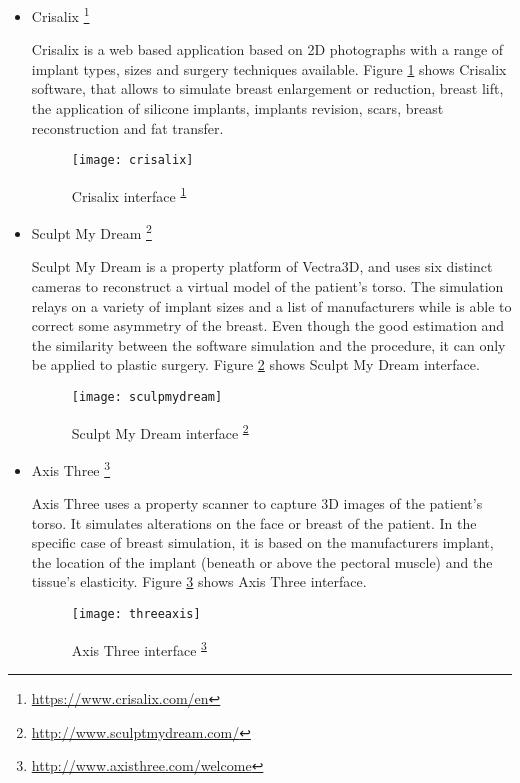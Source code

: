 \begin{itemize}
\item Crisalix \footnote{\label{crisalix} \url{https://www.crisalix.com/en}}

Crisalix is a web based application based on 2D photographs with a range of implant types, sizes and surgery techniques available. Figure \ref{fig:crisalix} shows Crisalix software, that allows to simulate breast enlargement or reduction, breast lift, the application of silicone implants, implants revision, scars, breast reconstruction and fat transfer.

\begin{figure}[H]
\begin{center}
    \leavevmode
    \texttt{[image: crisalix]}
    \caption[Crisalix interface]{Crisalix interface \textsuperscript{\ref{crisalix}}}
    \label{fig:crisalix}
  \end{center}
\end{figure}


\item Sculpt My Dream \footnote{\label{sculptmydream} \url{http://www.sculptmydream.com/}}

Sculpt My Dream is a property platform of Vectra3D, and uses six distinct cameras to reconstruct a virtual model of the patient's torso. The simulation relays on a variety of implant sizes and a list of manufacturers while is able to correct some asymmetry of the breast. Even though the good estimation and the similarity between the software simulation and the procedure, it can only be applied to plastic surgery. Figure \ref{fig:sculptmydream} shows Sculpt My Dream interface.

\begin{figure}[H]
\begin{center}
    \leavevmode
    \texttt{[image: sculpmydream]}
    \caption[SculptMyDream interface]{Sculpt My Dream interface \textsuperscript{\ref{sculptmydream}}}
    \label{fig:sculptmydream}
  \end{center}
\end{figure}

\item Axis Three \footnote{\label{threeaxis} \url{http://www.axisthree.com/welcome}}

Axis Three uses a property scanner to capture 3D images of the patient's torso. It simulates alterations on the face or breast of the patient. In the specific case of breast simulation, it is based on the manufacturers implant, the location of the implant (beneath or above the pectoral muscle) and the tissue's elasticity. Figure \ref{fig:threeaxis} shows Axis Three interface.
 
 \begin{figure}[H]
\begin{center}
    \leavevmode
    \texttt{[image: threeaxis]}
    \caption[Axis Three Software]{Axis Three interface \textsuperscript{\ref{threeaxis}}}
    \label{fig:threeaxis}
  \end{center}
\end{figure} 
 
\end{itemize}

